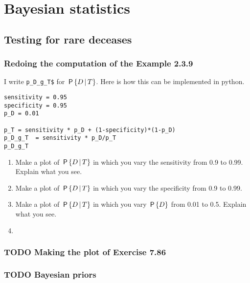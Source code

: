\documentclass[a4paper]{article}
\begin{document}
\section{Bayesian statistics}
\label{sec:org1f4616c}

\subsection{Testing for rare deceases}
\label{sec:orgb704f64}

\subsubsection{Redoing the  computation of the  Example 2.3.9}
\label{sec:orge3a48cf}

I write \texttt{p\_D\_g\_T\$} for \(\P{D\given T}\). Here is how this can be implemented in python.

\begin{verbatim}
sensitivity = 0.95
specificity = 0.95
p_D = 0.01

p_T = sensitivity * p_D + (1-specificity)*(1-p_D)
p_D_g_T  = sensitivity * p_D/p_T
p_D_g_T
\end{verbatim}

\begin{enumerate}
\item Make a plot of \(\P{D\given T}\) in which you vary the sensitivity from 0.9 to 0.99. Explain what you see.
\item Make a plot of \(\P{D\given T}\) in which you vary the specificity from 0.9 to 0.99.
\item Make a plot of \(\P{D\given T}\) in which you vary \(\P{D}\) from 0.01 to 0.5. Explain what you see.
\item 
\end{enumerate}



\subsubsection{{\bfseries\sffamily TODO} Making the plot of Exercise 7.86}
\label{sec:orgf534b47}

\subsubsection{{\bfseries\sffamily TODO} Bayesian priors}
\label{sec:orgac48e35}
\end{document}
